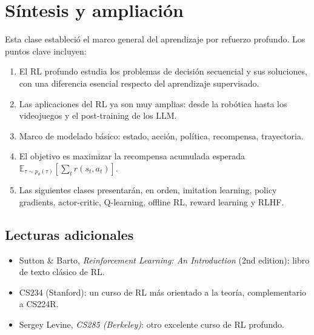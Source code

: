 \section{Síntesis y ampliación}

Esta clase estableció el marco general del aprendizaje por refuerzo profundo. Los puntos clave incluyen:

\begin{enumerate}
    \item El RL profundo estudia los problemas de decisión secuencial y sus soluciones, con una diferencia esencial respecto del aprendizaje supervisado.
    \item Las aplicaciones del RL ya son muy amplias: desde la robótica hasta los videojuegos y el post-training de los LLM.
    \item Marco de modelado básico: estado, acción, política, recompensa, trayectoria.
    \item El objetivo es maximizar la recompensa acumulada esperada $\mathbb{E}_{\tau \sim p_\theta(\tau)} \left[\sum_t r(s_t, a_t)\right]$.
    \item Las siguientes clases presentarán, en orden, imitation learning, policy gradients, actor-critic, Q-learning, offline RL, reward learning y RLHF.
\end{enumerate}

\subsection{Lecturas adicionales}
\begin{itemize}
    \item Sutton \& Barto, \textit{Reinforcement Learning: An Introduction} (2nd edition): libro de texto clásico de RL.
    \item CS234 (Stanford): un curso de RL más orientado a la teoría, complementario a CS224R.
    \item Sergey Levine, \textit{CS285 (Berkeley)}: otro excelente curso de RL profundo.
\end{itemize}



